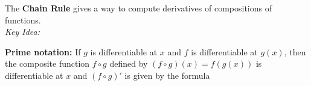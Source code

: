 \documentclass[10pt]{article}
\begin{document}

%    
%




\newpage%


{\bf {}}

The {\bf Chain Rule} gives a way to compute derivatives of compositions of functions. \\
{\em Key Idea:}

{\bf Prime notation:} If $g$ is differentiable at $x$ and $f$ is differentiable at $g(x)$, then the composite function $f \circ g$ defined by $(f \circ g)(x)=f(g(x))$ is differentiable at $x$ and $(f \circ g)'$ is given by the formula \\\\
\end{document}
